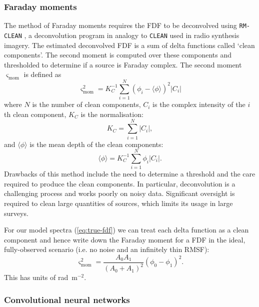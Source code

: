         \subsubsection{Faraday moments}
        \label{sec:faraday-moments}
            The method of Faraday moments requires the FDF to be deconvolved using \texttt{RM-CLEAN} \citeneeded{}, a deconvolution program in analogy to \texttt{CLEAN} used in radio synthesis imagery. The estimated deconvolved FDF is a sum of delta functions called `clean components'. The second moment is computed over these components and thresholded to determine if a source is Faraday complex. The second moment $\varsigma_{\mathrm{mom}}$ is defined as
            \begin{equation}
                \varsigma_{\mathrm{mom}}^2 = K_C^{-1} \sum_{i = 1}^N (\phi_i - \langle \phi \rangle)^2 |C_i|
            \end{equation}
            where $N$ is the number of clean components, $C_i$ is the complex intensity of the $i$th clean component, $K_C$ is the normalisation:
            \begin{equation}
                K_C = \sum_{i = 1}^N |C_i|,
            \end{equation}
            and $\langle \phi \rangle$ is the mean depth of the clean components:
            \begin{equation}
                \langle \phi \rangle = K_C^{-1} \sum_{i = 1}^N \phi_i |C_i|.
            \end{equation}
            Drawbacks of this method include the need to determine a threshold and the care required to produce the clean components. In particular, deconvolution is a challenging process and works poorly on noisy data. Significant oversight is required to clean large quantities of sources, which limits its usage in large surveys.

            For our model spectra (\autoref{eq:true-fdf}) we can treat each delta function as a clean component and hence write down the Faraday moment for a FDF in the ideal, fully-observed scenario (i.e. no noise and an infinitely thin RMSF):
            \begin{equation}
                \label{eq:model-moment}
                \varsigma_{\mathrm{mom}}^2 = \frac{A_0A_1}{(A_0 + A_1)^2} (\phi_0 - \phi_1)^2.
            \end{equation}
            This has units of rad~m$^{-2}$.

        \subsubsection{Convolutional neural networks}
        \label{sec:cnns}

